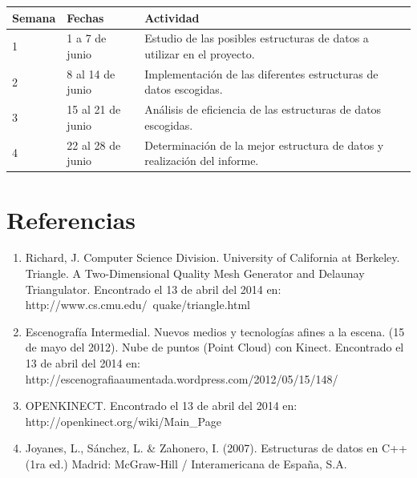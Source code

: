 \documentclass[letterpaper]{article}
\begin{document}
\begin{center}
\begin{tabular}{l l   @{\hspace{1cm}}p{10cm}}
\cline{3-3}

\toprule
\textbf{Semana} & \textbf{Fechas} & \textbf{Actividad} \\
\midrule
1 & 1 a 7 de junio & Estudio de las posibles estructuras de datos a utilizar en el proyecto. \\
2 & 8 al 14 de junio & Implementación de las diferentes estructuras de datos escogidas. \\

3 & 15 al 21 de junio & Análisis de eficiencia de las estructuras de datos escogidas. \\
4 & 22 al 28 de junio & Determinación de la mejor estructura de datos y realización del informe.\\

\bottomrule
\end{tabular}
\end{center}

\section{Referencias}

\begin{enumerate}

\item Richard, J. Computer Science Division. University of California at Berkeley. Triangle. A Two-Dimensional Quality Mesh Generator and 
Delaunay Triangulator. Encontrado el 13 de abril del 2014 en: http://www.cs.cmu.edu/~quake/triangle.html
\item Escenografía Intermedial. Nuevos medios y tecnologías afines a la escena. (15 de mayo del 2012).
Nube de puntos (Point Cloud) con Kinect. Encontrado el 13 de abril del 2014 en: http://escenografiaaumentada.wordpress.com/2012/05/15/148/
\item OPENKINECT. Encontrado el 13 de abril del 2014 en: http://openkinect.org/wiki/Main\_Page
\item Joyanes, L., Sánchez, L. \& Zahonero, I. (2007). Estructuras de datos en C++ (1ra ed.) Madrid: McGraw-Hill / Interamericana de España, S.A.



\end{enumerate}

	
\end{document}
